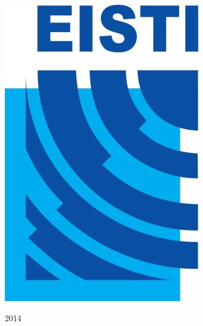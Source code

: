 \documentclass[11pt,a4paper, openany]{book}
\begin{document}
\begin{titlepage}


\includegraphics[scale=0.63] {logoEISTI.jpg}%
 

\vspace*{1cm}
{\large 2014}\\[3cm] %




\vfill %

\end{titlepage}
\end{document}

